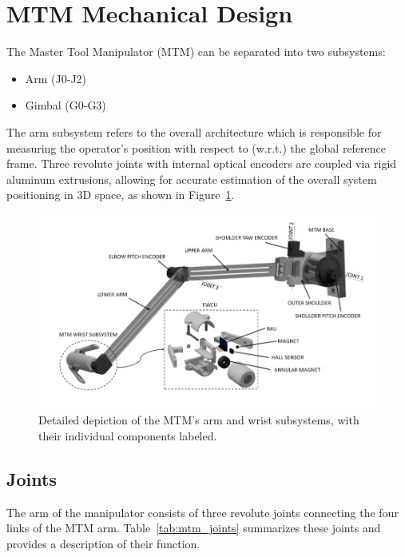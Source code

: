 \section{MTM Mechanical Design}

The Master Tool Manipulator (MTM) can be separated into two subsystems:
\begin{itemize}
    \item Arm (J0-J2)
    \item Gimbal (G0-G3)
\end{itemize}

The arm subsystem refers to the overall architecture which is responsible for measuring the operator's position with respect to (w.r.t.) the global reference frame. Three revolute joints with internal optical encoders are coupled via rigid aluminum extrusions, allowing for accurate estimation of the overall system positioning in 3D space, as shown in Figure~\ref{fig:mtm_overview}.

\begin{figure}[h]
    \centering
    \includegraphics[width=0.75\linewidth]{figures/mtm_overview.png}
    \caption{Detailed depiction of the MTM's arm and wrist subsystems, with their individual components labeled.}
    \label{fig:mtm_overview}
\end{figure}

\subsection{Joints}
The arm of the manipulator consists of three revolute joints connecting the four links of the MTM arm. Table~\ref{tab:mtm_joints} summarizes these joints and provides a description of their function.

